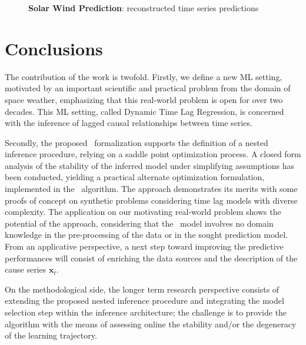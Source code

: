 \begin{figure}[!htb]
  \caption{\textbf{Solar Wind Prediction}: reconstructed time series predictions}
\end{figure}

\section{Conclusions}

The contribution of the work is twofold. Firstly, we define a new ML setting, motivated by an 
important scientific and practical problem from the domain of space weather, emphasizing that this 
real-world problem is open for over two decades. This ML setting, called 
Dynamic Time Lag Regression, is concerned with the inference of lagged causal relationships between 
time series. 

Secondly, the proposed \XX\ formalization supports the definition of a nested inference procedure, 
relying on a saddle point optimization process. A closed form analysis of the stability of the 
inferred model under simplifying assumptions has been conducted, yielding a practical alternate 
optimization formulation, implemented in the \XX\ algorithm. The approach demonstrates its merits 
with some proofs of concept on synthetic problems considering time lag models with diverse 
complexity. The application on our motivating real-world problem shows the potential of the 
approach, considering that the \XX\ model involves no domain knowledge in the pre-processing of the 
data or in the sought prediction model. From an applicative perspective, a next step toward 
improving the predictive performances will consist of enriching the data sources and the 
description of the cause series $\mathbf{x}_t$.

On the methodological side, the longer term research perspective consists of extending the proposed 
nested inference procedure and integrating the model selection step within the inference 
architecture; the challenge is to provide the algorithm with the means of assessing online the 
stability and/or the degeneracy of the learning trajectory. 



%
%
